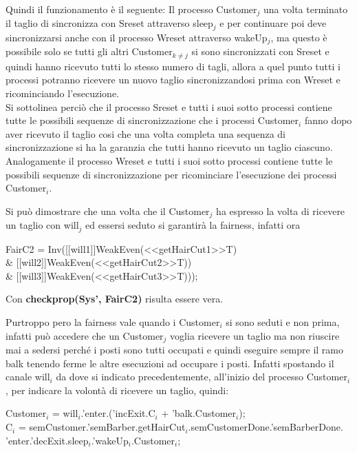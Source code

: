 Quindi il funzionamento è il seguente:
Il processo \textsf{Customer$_{j}$} una volta terminato il taglio di sincronizza con \textsf{Sreset} attraverso \textsf{sleep$_{j}$} e per continuare poi deve sincronizzarsi anche con il processo \textsf{Wreset} attraverso \textsf{wakeUp$_{j}$}, ma questo è possibile solo se tutti gli altri \textsf{Customer$_{k\not=j}$} si sono sincronizzati con \textsf{Sreset} e quindi hanno ricevuto tutti lo stesso numero di tagli, allora a quel punto tutti i processi potranno ricevere un nuovo taglio sincronizzandosi prima con \textsf{Wreset} e ricominciando l'esecuzione.\\
Si sottolinea perciò che il processo \textsf{Sreset} e tutti i suoi sotto processi contiene tutte le possibili sequenze di sincronizzazione che i processi \textsf{Customer$_{i}$} fanno dopo aver ricevuto il taglio cosi che una volta completa una sequenza di sincronizzazione si ha la garanzia che tutti hanno ricevuto un taglio ciascuno. Analogamente il processo \textsf{Wreset} e tutti i suoi sotto processi contiene tutte le possibili sequenze di sincronizzazione per ricominciare l'esecuzione dei processi \textsf{Customer$_{i}$}.

Si può dimostrare che una volta che il \textsf{Customer$_{j}$} ha espresso la volta di ricevere un taglio con \textsf{will$_{j}$} ed essersi seduto si garantirà la fairness, infatti ora

\begin{center}
	\textsf{FairC2 = Inv([[will1]]WeakEven(<<getHairCut1>>T) \\\& [[will2]]WeakEven(<<getHairCut2>>T)) \\\& [[will3]]WeakEven(<<getHairCut3>>T)));}
\end{center}

Con \textbf{checkprop(Sys', FairC2)} risulta essere vera.

Purtroppo pero la fairness vale quando i \textsf{Customer$_{i}$} si sono seduti e non prima, infatti può accedere che un \textsf{Customer$_{j}$} voglia ricevere un taglio ma non riuscire mai a sedersi perché i posti sono tutti occupati e quindi eseguire sempre il ramo \textsf{balk} tenendo ferme le altre esecuzioni ad occupare i posti. Infatti spostando il canale \textsf{will$_{i}$} da dove si indicato precedentemente, all'inizio del processo \textsf{Customer$_{i}$}, per indicare la volontà di ricevere un taglio, quindi: 

\textsf{Customer$_{i}$ = will$_{i}$.'enter.('incExit.C$_{i}$ + 'balk.Customer$_{i}$);}\\
\textsf{C$_{i}$ = semCustomer.'semBarber.getHairCut$_{i}$.semCustomerDone.'semBarberDone.\\'enter.'decExit.sleep$_{i}$.'wakeUp$_{i}$.Customer$_{i}$;}

